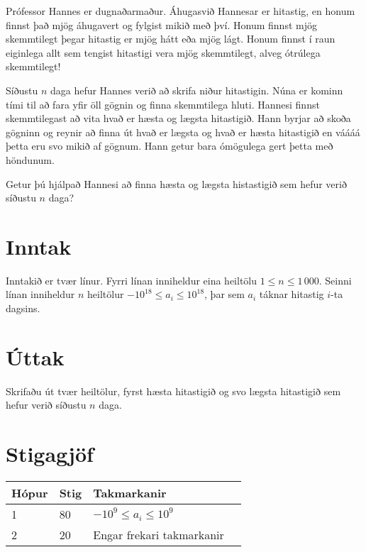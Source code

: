 Prófessor Hannes er dugnaðarmaður.
Áhugasvið Hannesar er hitastig, en honum finnst það mjög áhugavert og fylgist mikið með því.
Honum finnst mjög skemmtilegt þegar hitastig er mjög hátt eða mjög lágt.
Honum finnst í raun eiginlega allt sem tengist hitastigi vera mjög skemmtilegt, alveg ótrúlega skemmtilegt!

Síðustu $n$ daga hefur Hannes verið að skrifa niður hitastigin.
Núna er kominn tími til að fara yfir öll gögnin og finna skemmtilega hluti.
Hannesi finnst skemmtilegast að vita hvað er hæsta og lægsta hitastigið.
Hann byrjar að skoða gögninn og reynir að finna út hvað er lægsta og hvað er hæsta hitastigið en váááá þetta eru svo mikið af gögnum.
Hann getur bara ómögulega gert þetta með höndunum.

Getur þú hjálpað Hannesi að finna hæsta og lægsta histastigið sem hefur verið síðustu $n$ daga?

\section*{Inntak}
Inntakið er tvær línur. Fyrri línan inniheldur eina heiltölu $1 \le n \le 1\,000$.
Seinni línan inniheldur $n$ heiltölur $-10^{18} \le a_i \le 10^{18}$, þar sem  $a_i$ táknar hitastig $i$-ta dagsins.

\section*{Úttak}
Skrifaðu út tvær heiltölur, fyrst hæsta hitastigið og svo lægsta hitastigið sem hefur verið síðustu $n$ daga.

\section*{Stigagjöf}
\begin{tabular}{|l|l|l|l|}
\hline
Hópur & Stig & Takmarkanir \\ \hline
1     & 80    & $-10^9 \le a_i \le 10^9 $\\ \hline
2     & 20    & Engar frekari takmarkanir \\ \hline
\end{tabular}
